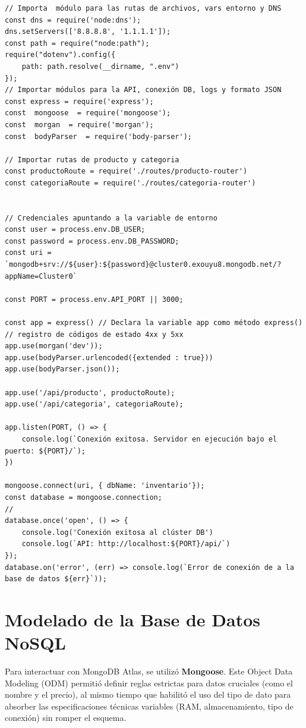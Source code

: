 \begin{lstlisting}[caption={Archivo principal de configuración del servidor (server.js)}]
// Importa  módulo para las rutas de archivos, vars entorno y DNS
const dns = require('node:dns');
dns.setServers(['8.8.8.8', '1.1.1.1']);
const path = require("node:path");
require("dotenv").config({
    path: path.resolve(__dirname, ".env")
});
// Importar módulos para la API, conexión DB, logs y formato JSON
const express = require('express');
const  mongoose  = require('mongoose');
const  morgan  = require('morgan');
const  bodyParser  = require('body-parser');

// Importar rutas de producto y categoria
const productoRoute = require('./routes/producto-router')
const categoriaRoute = require('./routes/categoria-router')


// Credenciales apuntando a la variable de entorno
const user = process.env.DB_USER;
const password = process.env.DB_PASSWORD;
const uri = `mongodb+srv://${user}:${password}@cluster0.exouyu8.mongodb.net/?appName=Cluster0`

const PORT = process.env.API_PORT || 3000;

const app = express() // Declara la variable app como método express()
// registro de códigos de estado 4xx y 5xx
app.use(morgan('dev'));
app.use(bodyParser.urlencoded({extended : true}))
app.use(bodyParser.json());

app.use('/api/producto', productoRoute);
app.use('/api/categoria', categoriaRoute);

app.listen(PORT, () => {
    console.log(`Conexión exitosa. Servidor en ejecución bajo el puerto: ${PORT}/`);
})

mongoose.connect(uri, { dbName: 'inventario'});
const database = mongoose.connection;
// 
database.once('open', () => {
    console.log('Conexión exitosa al clúster DB')
    console.log(`API: http://localhost:${PORT}/api/`)
});
database.on('error', (err) => console.log(`Error de conexión de a la base de datos ${err}`));
\end{lstlisting}

\section{Modelado de la Base de Datos NoSQL}
Para interactuar con MongoDB Atlas, se utilizó \textbf{Mongoose}. Este Object Data Modeling (ODM) permitió definir reglas estrictas para datos cruciales (como el nombre y el precio), al mismo tiempo que habilitó el uso del tipo de dato  para absorber las especificaciones técnicas variables (RAM, almacenamiento, tipo de conexión) sin romper el esquema.

